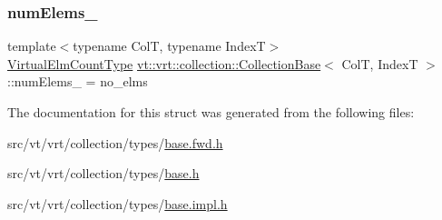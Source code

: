 \mbox{\label{structvt_1_1vrt_1_1collection_1_1_collection_base_a51c5c2114bb9b849878e384c25c4497b}} 
\subsubsection{\texorpdfstring{num\+Elems\+\_\+}{numElems\_}}
{\footnotesize\ttfamily template$<$typename ColT, typename IndexT$>$ \\
\hyperlink{namespacevt_ac115668758184050beff7a9281a2c490}{Virtual\+Elm\+Count\+Type} \hyperlink{structvt_1_1vrt_1_1collection_1_1_collection_base}{vt\+::vrt\+::collection\+::\+Collection\+Base}$<$ ColT, IndexT $>$\+::num\+Elems\+\_\+ = no\+\_\+elms\hspace{0.3cm}{\ttfamily [protected]}}



The documentation for this struct was generated from the following files\+:\begin{DoxyCompactItemize}
\item 
src/vt/vrt/collection/types/\hyperlink{base_8fwd_8h}{base.\+fwd.\+h}\item 
src/vt/vrt/collection/types/\hyperlink{src_2vt_2vrt_2collection_2types_2base_8h}{base.\+h}\item 
src/vt/vrt/collection/types/\hyperlink{base_8impl_8h}{base.\+impl.\+h}\end{DoxyCompactItemize}
